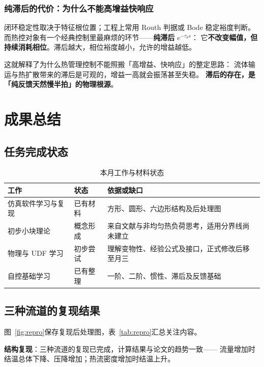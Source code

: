 \documentclass[stage1,fontset=fandol]{ydzjreport}
\begin{document}
	\subsubsection{纯滞后的代价：为什么不能高增益快响应}

	闭环稳定性取决于特征根位置；工程上常用 Routh 判据或 Bode 稳定裕度判断。
	而热控对象有一个经典控制里最麻烦的环节——\textbf{纯滞后} $e^{-\tau_d s}$：
	它\textbf{不改变幅值，但持续消耗相位}。滞后越大，相位裕度越小，允许的增益越低。

	这就解释了为什么热管理控制不能照搬「高增益、快响应」的整定思路：
	流体输运与热扩散带来的滞后是可观的，增益一高就会振荡甚至失稳。
	\textbf{滞后的存在，是「纯反馈天然慢半拍」的物理根源}。

\section{成果总结}

\subsection{任务完成状态}

\begin{table}[H]\centering
\caption{本月工作与材料状态}\label{tab:tasks}
\begin{tabularx}{\textwidth}{@{}Y Y Y@{}}
\toprule
{} 工作 & 状态 & 依据或缺口 \\
\midrule
仿真软件学习与复现 & 已有材料 & 方形、圆形、六边形结构及后处理图 \\
初步小块理论 & 概念形成 & 来自文献与非均匀热负荷思考，适用分界线尚未建立 \\
物理与 UDF 学习 & 初步尝试 & 理解变物性、经验公式及接口，正式修改后移至月三 \\
自控基础学习 & 已有整理 & 一阶、二阶、惯性、滞后及反馈基础 \\
\bottomrule\end{tabularx}\end{table}

\subsection{三种流道的复现结果}

图~\ref{fig:repro}保存复现后处理图，表~\ref{tab:repro}汇总关注内容。

	\textbf{结构复现}：三种流道的复现已完成，计算结果与论文的趋势一致——
	流量增加时结温总体下降、压降增加；热流密度增加时结温上升。
\end{document}

